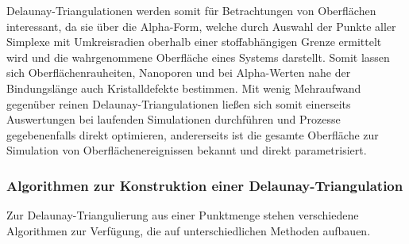 Delaunay-Triangulationen werden somit für Betrachtungen von Oberflächen interessant, da sie über die Alpha-Form, welche durch Auswahl der Punkte aller Simplexe mit Umkreisradien oberhalb einer stoffabhängigen Grenze ermittelt wird und die wahrgenommene Oberfläche eines Systems darstellt.
Somit lassen sich Oberflächenrauheiten, Nanoporen und bei Alpha-Werten nahe der Bindungslänge auch Kristalldefekte bestimmen.
Mit wenig Mehraufwand gegenüber reinen Delaunay-Triangulationen ließen sich somit einerseits Auswertungen bei laufenden Simulationen durchführen und Prozesse gegebenenfalls direkt optimieren, andererseits ist die gesamte Oberfläche zur Simulation von Oberflächenereignissen bekannt und direkt parametrisiert.

\subsubsection{Algorithmen zur Konstruktion einer Delaunay-Triangulation}

Zur Delaunay-Triangulierung aus einer Punktmenge stehen verschiedene Algorithmen zur Verfügung, die auf unterschiedlichen Methoden aufbauen.

